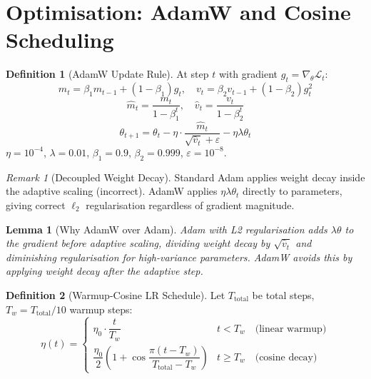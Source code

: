 \documentclass[12pt,a4paper]{article}
\theoremstyle{definition}
\newtheorem{definition}{Definition}[section]
\theoremstyle{plain}
\newtheorem{lemma}[theorem]{Lemma}
\theoremstyle{remark}
\newtheorem{remark}{Remark}[section]
\begin{document}
\section{Optimisation: AdamW and Cosine Scheduling}
\label{sec:optim}

\begin{definition}[AdamW Update Rule]
At step $t$ with gradient $g_t = \nabla_\theta \mathcal{L}_t$:
\[
  m_t = \beta_1 m_{t-1} + (1-\beta_1)g_t, \quad v_t = \beta_2 v_{t-1} + (1-\beta_2)g_t^2
\]
\[
  \hat{m}_t = \frac{m_t}{1-\beta_1^t}, \quad \hat{v}_t = \frac{v_t}{1-\beta_2^t}
\]
\[
  \boxed{\theta_{t+1} = \theta_t - \eta \cdot \frac{\hat{m}_t}{\sqrt{\hat{v}_t}+\varepsilon} - \eta\lambda\theta_t}
\]
$\eta = 10^{-4}$, $\lambda = 0.01$, $\beta_1 = 0.9$, $\beta_2 = 0.999$, $\varepsilon = 10^{-8}$.
\end{definition}

\begin{remark}[Decoupled Weight Decay]
Standard Adam applies weight decay inside the adaptive scaling (incorrect). AdamW applies $\eta\lambda\theta_t$ directly to parameters, giving correct $\ell_2$ regularisation regardless of gradient magnitude.
\end{remark}

\begin{lemma}[Why AdamW over Adam]
Adam with L2 regularisation adds $\lambda\theta$ to the gradient before adaptive scaling, dividing weight decay by $\sqrt{\hat{v}_t}$ and diminishing regularisation for high-variance parameters. AdamW avoids this by applying weight decay after the adaptive step.
\end{lemma}

\begin{definition}[Warmup-Cosine LR Schedule]
Let $T_{\text{total}}$ be total steps, $T_w = T_{\text{total}}/10$ warmup steps:
\[
  \eta(t) = \begin{cases}
    \eta_0 \cdot \dfrac{t}{T_w} & t < T_w \quad\text{(linear warmup)}\\[6pt]
    \dfrac{\eta_0}{2}\!\left(1+\cos\dfrac{\pi(t-T_w)}{T_{\text{total}}-T_w}\right) & t \ge T_w \quad\text{(cosine decay)}
  \end{cases}
\]
\end{definition}
\end{document}
